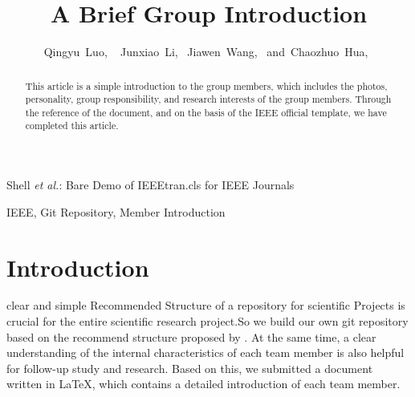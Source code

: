 \documentclass[journal]{IEEEtran}
\begin{document}
\title{A Brief Group Introduction}


\author{Qingyu~Luo, ~
        Junxiao~Li,~
        Jiawen~Wang,~
        and~Chaozhuo~Hua,~%
}


%
{Shell \MakeLowercase{\textit{et al.}}: Bare Demo of IEEEtran.cls for IEEE Journals}




\maketitle

\begin{abstract}
	This article is a simple introduction to the group members, which includes the photos, personality, group responsibility, and research interests of the group members. Through the reference of the document, and on the basis of the IEEE official template, we have completed this article.
\end{abstract}

\begin{IEEEkeywords}
IEEE, Git Repository, Member Introduction
\end{IEEEkeywords}




\IEEEpeerreviewmaketitle



\section{Introduction}

 clear and simple Recommended Structure of a repository for scientific Projects is crucial for the entire scientific research project.So we build our own git repository based on the recommend structure proposed by \citet{2020A}.
At the same time, a clear understanding of the internal characteristics of each team member is also helpful for follow-up study and research. 
Based on this, we submitted a document written in \LaTeX, which contains a detailed introduction of each team member.
\end{document}
